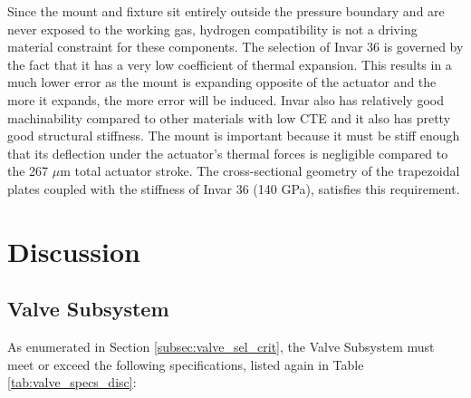 \documentclass[12pt, letterpaper]{report}%
\newcounter{mycounter}           %
\newcounter{sub}[mycounter]      %
\begin{document}
            Since the mount and fixture sit entirely outside the pressure boundary and are never exposed to the working gas, hydrogen compatibility is not a driving material constraint for these components. The selection of Invar 36 is governed by the fact that it has a very low coefficient of thermal expansion. This results in a much lower error as the mount is expanding opposite of the actuator and the more it expands, the more error will be induced. Invar also has relatively good machinability compared to other materials with low CTE and it also has pretty good structural stiffness. The mount is important because it must be stiff enough that its deflection under the actuator's thermal forces is negligible compared 
            to the 267 $\mu$m total actuator stroke. The cross-sectional geometry of the trapezoidal plates coupled with the stiffness of Invar 36 (140 GPa), satisfies this requirement. 
        

%

\chapter{Discussion}
\label{sec:discussion}
    \section{Valve Subsystem}
            As enumerated in Section \ref{subsec:valve_sel_crit}, the Valve Subsystem must meet or exceed the following specifications, listed again in Table \ref{tab:valve_specs_disc}:
\end{document}
